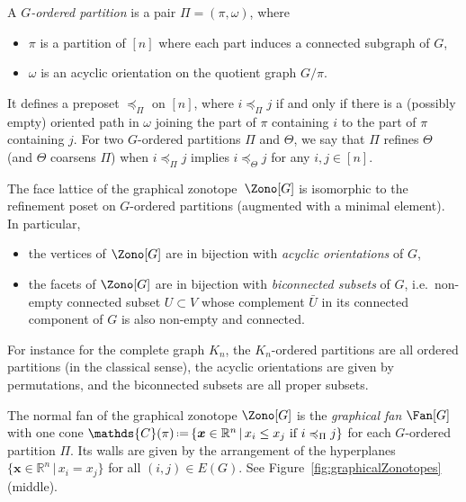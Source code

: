 \documentclass[AHL,Unicode,longabstracts,published]{cedram}
\newcommand{\R}{\mathbb{R}}
\renewcommand{\b}[1]{\boldsymbol{#1}}
\newcommand{\eqdef}{\mbox{\,\raisebox{0.2ex}{\scriptsize\ensuremath{\mathrm:}}\ensuremath{=}\,}}
\newcommand{\ie}{i.e.~}
\newcommand{\polytope}[1]{\mathds{#1}}
\begin{document}
\pagebreak
\begin{defi}\label{def:Gpartition}
A
\emph{$G$-ordered partition} is a pair $\Pi = (\pi, \omega)$, where
\begin{itemize}
\item $\pi$ is a partition of $[n]$ where each part induces a connected subgraph of $G$,
\item $\omega$ is an acyclic orientation on the quotient graph $G/\pi$.
\end{itemize}
It defines a preposet $\preccurlyeq_\Pi$ on $[n]$, where $i \preccurlyeq_\Pi j$ if and only if there is a (possibly empty) oriented path in $\omega$ joining the part of $\pi$ containing $i$ to the part of $\pi$ containing $j$. For two $G$-ordered partitions $\Pi$ and $\Theta$, we say that $\Pi$ refines $\Theta$ (and $\Theta$ coarsens $\Pi$) when $i \preccurlyeq_\Pi j$ implies $i \preccurlyeq_\Theta j$ for any $i,j \in [n]$.
\end{defi}

\begin{prop}\label{prop:facesGraphicalZonotope}
The face lattice of the graphical zonotope~$\Zono[G]$ is isomorphic to the refinement poset on $G$-ordered partitions (augmented with a minimal element). In particular,
\begin{itemize}
\item the vertices of $\Zono[G]$ are in bijection with
\emph{acyclic orientations} of $G$,
\item the facets of $\Zono[G]$ are in bijection with
\emph{biconnected subsets} of $G$, \ie non-empty connected subset $U \subset V$ whose complement $\bar U$ in its connected component of $G$ is also non-empty and connected.
\end{itemize}
\end{prop}

For instance for the complete graph $K_n$, the $K_n$-ordered partitions are all ordered partitions (in the classical sense), the acyclic orientations are given by permutations, and the biconnected subsets are all proper subsets.

\begin{prop}\label{prop:graphicalFan}
The normal fan of the graphical zonotope $\Zono[G]$ is the
\emph{graphical fan} $\Fan[G]$ with one cone $\polytope{C}(\pi) \eqdef \{\b{x} \in \R^n\,|\,x_i \le x_j \text{ if } i \preccurlyeq_\Pi j\}$ for each \linebreak $G$-ordered partition $\Pi$. Its walls are given by the arrangement of the hyperplanes \linebreak $\{\b{x} \in \R^n\,|\,x_i = x_j\}$ for all $(i,j) \in E(G)$. See Figure~\ref{fig:graphicalZonotopes}\,(middle).
\end{prop}
\end{document}
